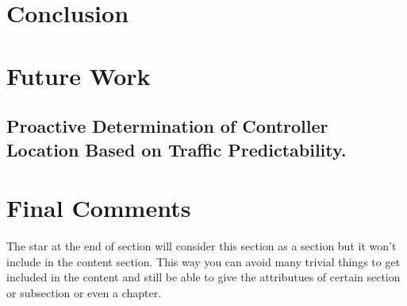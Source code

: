 \section{Conclusion}

\section{Future Work}
\subsection{Proactive Determination of Controller Location Based on Traffic Predictability.}

\section*{Final Comments}
The star at the end of section will consider this section as a section but it won't include in the content section. This way you can avoid many trivial things to get included in the content and still be able to give the attributues of certain section or subsection or even a chapter. 